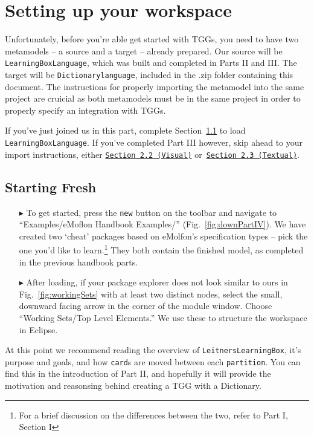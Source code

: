 \newpage
\section{Setting up your workspace}
\genHeader

Unfortunately, before you're able get started with  TGGs, you need to have two metamodels -- a source and a target -- already prepared. Our source will be
\texttt{LearningBoxLanguage}, which was built and completed in Parts II and III. The target will be \texttt{Dictionarylanguage}, included in the .zip
folder containing this document. The instructions for properly importing the metamodel into the same project are cruicial as both metamodels must be in the same
project in order to properly specify an integration with TGGs.

If you've just joined us in this part, complete Section~\ref{sec:loadSourceMeta} to load \texttt{Learn\-ing\-Box\-Lang\-uage}. If you've completed Part III
however, skip ahead to your import instructions, either \texttt{\hyperlink{sec:multiEAP}{Section 2.2 (Visual)}} or~\texttt{\hyperlink{sec:multiMOSL}{Section 2.3
(Textual)}}.

\subsection{Starting Fresh}
\label{sec:loadSourceMeta}
\begin{itemize}

\item[$\blacktriangleright$] To get started, press the \texttt{new} button on the toolbar and navigate to ``Examples/eMoflon Handbook Examples/''
(Fig.~\ref{fig:downPartIV}).  We have created two `cheat' packages based on eMolfon's specification types --  pick the one you'd like to learn.\footnote{For a
brief discussion on the differences between the two, refer to Part I, Section I} They both contain the finished model, as completed in the previous handbook
parts.

\item[$\blacktriangleright$] After loading, if your package explorer does not look similar to ours in Fig.~\ref{fig:workingSets} with at least two distinct
nodes, select the small, downward facing arrow in the corner of the module window. Choose ``Working Sets/Top Level Elements.'' We use these to structure the
workspace in Eclipse.

\end{itemize}

At this point we recommend reading the overview of \texttt{LeitnersLearningBox}, it's purpose and goals, and how \texttt{card}s are moved between each
\texttt{partition}. You can find this in the introduction of Part II, and hopefully it will provide the motivation and reasonsing behind creating a TGG with
a Dictionary.

